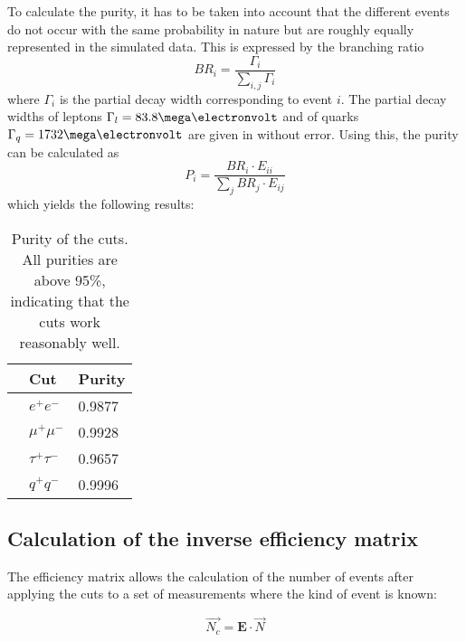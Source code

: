 To calculate the purity, it has to be taken into account that the different events do not occur with the same probability in nature but are roughly equally represented in the simulated data. This is expressed by the branching ratio
\begin{equation}
BR_i=\frac{\Gamma_i}{\sum_{i,j}\Gamma_{i}}
\end{equation}
where $\Gamma_i$ is the partial decay width corresponding to event $i$. The partial decay widths of leptons $\Gamma_l=\unit{83.8}{\mega\electronvolt}$ and of quarks $\Gamma_q=\unit{1732}{\mega\electronvolt}$ are given in \cite{staatsex} without error.
Using this, the purity can be calculated as
\begin{equation}
P_i=\frac{BR_i\cdot E_{ii}}{\sum_{j}BR_j\cdot E_{ij}}
\end{equation}
which yields the following results:

\begin{table}[H]\centering
	\begin{tabular}{@{}lll@{}}
		\toprule
		&Cut&Purity\\
		\midrule
		&$e^+e^-$&0.9877\\
		&$\mu^+\mu^-$&0.9928\\
		&$\tau^+\tau^-$&0.9657\\
		&$q^+q^-$&0.9996\\
		\bottomrule
	\end{tabular}
	\caption[Purity of the cuts]{Purity of the cuts. All purities are above 95\%, indicating that the cuts work reasonably well.}
	\label{tb:purity}
\end{table}

\subsection{Calculation of the inverse efficiency matrix}
The efficiency matrix allows the calculation of the number of events after applying the cuts to a set of measurements where the kind of event is known:

\begin{equation}
\vec{N_c}=\boldsymbol{E}\cdot\vec{N}
\end{equation} 

